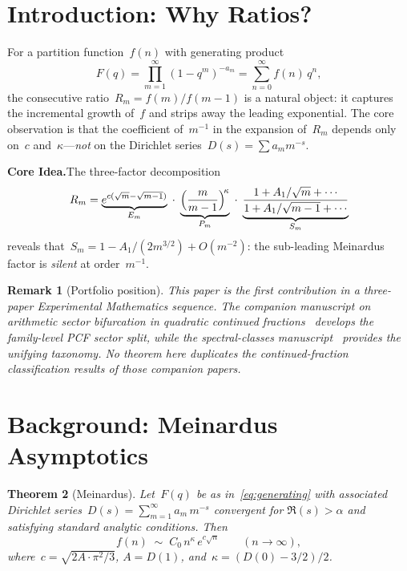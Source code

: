\documentclass[11pt,a4paper]{article}
\newtheorem{theorem}{Theorem}[section]
\newtheorem{remark}[theorem]{Remark}
\begin{document}
\section{Introduction: Why Ratios?}\label{sec:intro}

For a partition function~$f(n)$ with generating product
\begin{equation}\label{eq:generating}
  F(q) = \prod_{m=1}^{\infty}(1-q^m)^{-a_m} = \sum_{n=0}^{\infty} f(n)\,q^n,
\end{equation}
the consecutive ratio~$R_m = f(m)/f(m-1)$ is a natural object: it captures the incremental growth of~$f$ and strips away the leading exponential. The core observation is that the coefficient of~$m^{-1}$ in the expansion of~$R_m$ depends only on~$c$ and~$\kappa$---\emph{not} on the Dirichlet series~$D(s) = \sum a_m m^{-s}$.

\medskip
\noindent\textbf{Core Idea.}\quad The three-factor decomposition
\[
  R_m = \underbrace{e^{c(\sqrt{m}-\sqrt{m-1})}}_{E_m}\;\cdot\;
        \underbrace{\Bigl(\frac{m}{m-1}\Bigr)^{\!\kappa}}_{P_m}\;\cdot\;
        \underbrace{\frac{1 + A_1/\sqrt{m} + \cdots}{1 + A_1/\sqrt{m-1} + \cdots}}_{S_m}
\]
reveals that~$S_m = 1 - A_1/(2m^{3/2}) + O(m^{-2})$: the sub-leading Meinardus factor is \emph{silent} at order~$m^{-1}$.

\begin{remark}[Portfolio position]
This paper is the first contribution in a three-paper Experimental Mathematics sequence. The companion manuscript on arithmetic sector bifurcation in quadratic continued fractions~\cite{pcf_bifurcation_2026} develops the family-level PCF sector split, while the spectral-classes manuscript~\cite{pcf_spectral_2026} provides the unifying taxonomy. No theorem here duplicates the continued-fraction classification results of those companion papers.
\end{remark}

\section{Background: Meinardus Asymptotics}\label{sec:background}

\begin{theorem}[Meinardus]\label{thm:meinardus}
Let~$F(q)$ be as in~\eqref{eq:generating} with associated Dirichlet series~$D(s) = \sum_{m=1}^\infty a_m\,m^{-s}$ convergent for $\Re(s) > \alpha$ and satisfying standard analytic conditions. Then
\begin{equation}\label{eq:meinardus}
  f(n) \;\sim\; C_0\,n^{\kappa}\,e^{c\sqrt{n}} \qquad (n \to \infty),
\end{equation}
where~$c = \sqrt{2A \cdot \pi^2/3}$, $A = D(1)$, and~$\kappa = (D(0) - 3/2)/2$.
\end{theorem}
\end{document}
